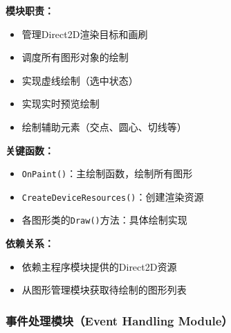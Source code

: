 \documentclass[12pt,a4paper]{article}
\begin{document}
\begin{tcolorbox}
\textbf{模块职责：}
\begin{itemize}
    \item 管理Direct2D渲染目标和画刷
    \item 调度所有图形对象的绘制
    \item 实现虚线绘制（选中状态）
    \item 实现实时预览绘制
    \item 绘制辅助元素（交点、圆心、切线等）
\end{itemize}

\textbf{关键函数：}
\begin{itemize}
    \item \texttt{OnPaint()}：主绘制函数，绘制所有图形
    \item \texttt{CreateDeviceResources()}：创建渲染资源
    \item 各图形类的\texttt{Draw()}方法：具体绘制实现
\end{itemize}

\textbf{依赖关系：}
\begin{itemize}
    \item 依赖主程序模块提供的Direct2D资源
    \item 从图形管理模块获取待绘制的图形列表
\end{itemize}
\end{tcolorbox}

\subsubsection{事件处理模块（Event Handling Module）}
\end{document}
